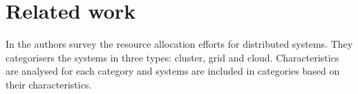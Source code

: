 \section{Related work}
\label{sec:relatesWork}

In \cite{Hussain2013} the authors survey the resource allocation efforts for distributed systems. They categorisers the systems in three types: cluster, grid and cloud. Characteristics are analysed for each category and systems are included in categories based on their characteristics.